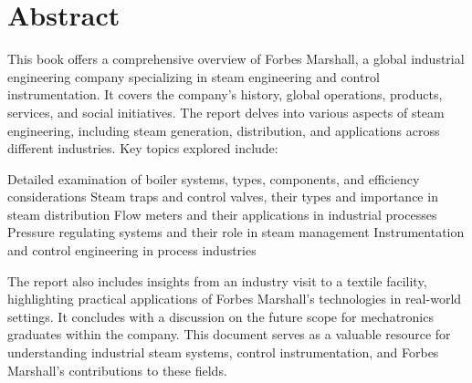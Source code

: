 \section*{Abstract} 
 
This book offers a comprehensive overview of Forbes Marshall, a global industrial engineering company specializing in steam engineering and control instrumentation. It covers the company's history, global operations, products, services, and social initiatives. The report delves into various aspects of steam engineering, including steam generation, distribution, and applications across different industries.
Key topics explored include:

Detailed examination of boiler systems, types, components, and efficiency considerations
Steam traps and control valves, their types and importance in steam distribution
Flow meters and their applications in industrial processes
Pressure regulating systems and their role in steam management
Instrumentation and control engineering in process industries

The report also includes insights from an industry visit to a textile facility, highlighting practical applications of Forbes Marshall's technologies in real-world settings. It concludes with a discussion on the future scope for mechatronics graduates within the company.
This document serves as a valuable resource for understanding industrial steam systems, control instrumentation, and Forbes Marshall's contributions to these fields.


